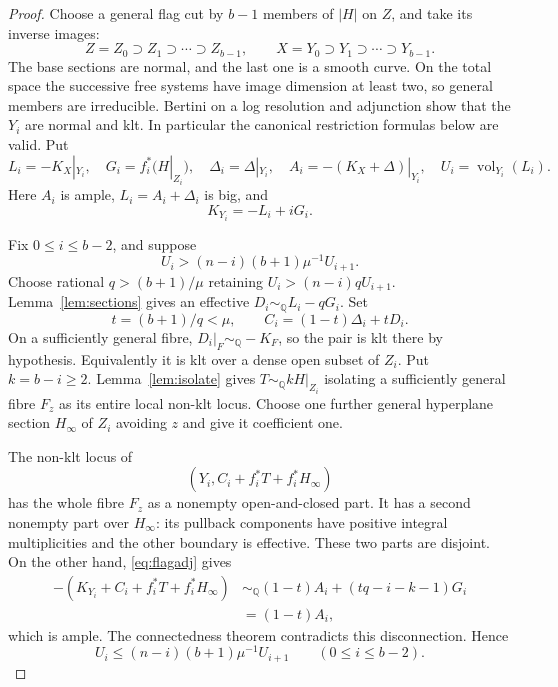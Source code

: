 \documentclass[11pt,reqno]{amsart}
\numberwithin{equation}{section}
\theoremstyle{definition}
\theoremstyle{remark}
\newcommand{\Q}{\mathbb Q}
\newcommand{\simq}{\sim_{\Q}}
\newcommand{\vol}{\operatorname{vol}}
\begin{document}
\begin{proof}
Choose a general flag cut by $b-1$ members of $|H|$ on $Z$, and take its inverse images:
\[
 Z=Z_0\supset Z_1\supset\cdots\supset Z_{b-1},
 \qquad X=Y_0\supset Y_1\supset\cdots\supset Y_{b-1}.
\]
The base sections are normal, and the last one is a smooth curve. On the total space the successive free systems have image dimension at least two, so general members are irreducible. Bertini on a log resolution and adjunction show that the $Y_i$ are normal and klt. In particular the canonical restriction formulas below are valid. Put
\[
 L_i=-K_X|_{Y_i},\quad G_i=f_i^*(H|_{Z_i}),\quad
 \Delta_i=\Delta|_{Y_i},\quad
 A_i=-(K_X+\Delta)|_{Y_i},\quad U_i=\vol_{Y_i}(L_i).
\]
Here $A_i$ is ample, $L_i=A_i+\Delta_i$ is big, and
\begin{equation}\label{eq:flagadj}
 K_{Y_i}=-L_i+iG_i.
\end{equation}

Fix $0\le i\le b-2$, and suppose
\[
 U_i>(n-i)(b+1)\mu^{-1}U_{i+1}.
\]
Choose rational $q>(b+1)/\mu$ retaining $U_i>(n-i)qU_{i+1}$. Lemma~\ref{lem:sections} gives an effective $D_i\simq L_i-qG_i$. Set
\[
 t=(b+1)/q<\mu,\qquad C_i=(1-t)\Delta_i+tD_i.
\]
On a sufficiently general fibre, $D_i|_F\simq-K_F$, so the pair is klt there by hypothesis. Equivalently it is klt over a dense open subset of $Z_i$. Put $k=b-i\ge2$. Lemma~\ref{lem:isolate} gives $T\simq kH|_{Z_i}$ isolating a sufficiently general fibre $F_z$ as its entire local non-klt locus. Choose one further general hyperplane section $H_\infty$ of $Z_i$ avoiding $z$ and give it coefficient one.

The non-klt locus of
\[
 (Y_i,C_i+f_i^*T+f_i^*H_\infty)
\]
has the whole fibre $F_z$ as a nonempty open-and-closed part. It has a second nonempty part over $H_\infty$: its pullback components have positive integral multiplicities and the other boundary is effective. These two parts are disjoint. On the other hand, \eqref{eq:flagadj} gives
\begin{align*}
 -(K_{Y_i}+C_i+f_i^*T+f_i^*H_\infty)
 &\simq(1-t)A_i+(tq-i-k-1)G_i\\
 &=(1-t)A_i,
\end{align*}
which is ample. The connectedness theorem \cite[Theorem~5.48]{KM98} contradicts this disconnection. Hence
\begin{equation}\label{eq:flagsteps}
 U_i\le(n-i)(b+1)\mu^{-1}U_{i+1}
 \qquad(0\le i\le b-2).
\end{equation}


\end{proof}
\end{document}
